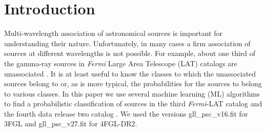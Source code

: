 \documentclass{aa}
\newcommand{\Fermi}{\textit{Fermi}\xspace}
\begin{document}

\maketitle


\section{Introduction}

Multi-wavelength association of astronomical sources is important for understanding their nature.
Unfortunately, in many cases a firm association of sources at different wavelengths is not possible.
For example, about one third of the gamma-ray sources in \Fermi Large Area Telescope (LAT) catalogs are unassociated
\citep{2010ApJS..188..405A, 2012ApJS..199...31N, 2015ApJS..218...23A, 2020ApJS..247...33A}.
It is at least useful to know the classes to which the unassociated sources belong to or, as is more typical,
the probabilities for the sources to belong to various classes.
In this paper we use several machine learning (ML) algorithms to find a probabilistic classification of
 sources in the third \Fermi-LAT catalog \citep[3FGL,][]{2015ApJS..218...23A} and the fourth data release two catalog
\citep[4FGL-DR2,][]{2020ApJS..247...33A, 2020arXiv200511208B}. We used the versions gll\_psc\_v16.fit for 3FGL
and gll\_psc\_v27.fit for 4FGL-DR2.
\end{document}

